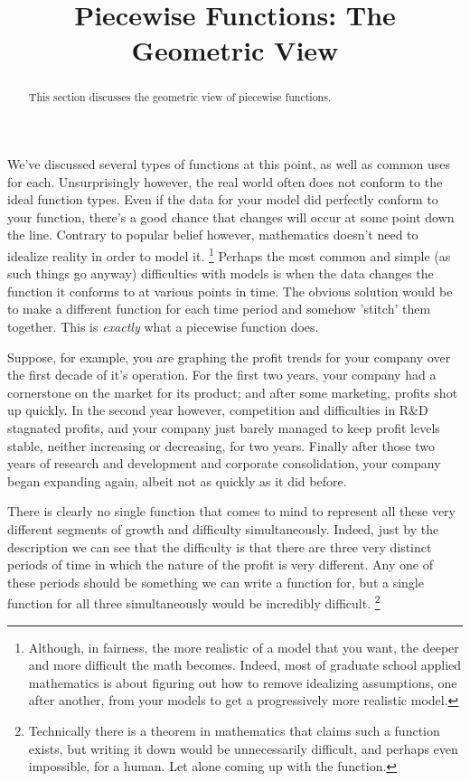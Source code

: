 \documentclass{ximeraXloud}
\title{Piecewise Functions: The Geometric View}
\begin{document}
\begin{abstract}
    This section discusses the geometric view of piecewise functions.
\end{abstract}
\maketitle

We've discussed several types of functions at this point, as well as common uses for each. Unsurprisingly however, the real world often does not conform to the ideal function types. Even if the data for your model did perfectly conform to your function, there's a good chance that changes will occur at some point down the line. Contrary to popular belief however, mathematics doesn't need to idealize reality in order to model it.%
\footnote{Although, in fairness, the more realistic of a model that you want, the deeper and more difficult the math becomes. Indeed, most of graduate school applied mathematics is about figuring out how to remove idealizing assumptions, one after another, from your models to get a progressively more realistic model.}
Perhaps the most common and simple (as such things go anyway) difficulties with models is when the data changes the function it conforms to at various points in time. The obvious solution would be to make a different function for each time period and somehow 'stitch' them together. This is \textit{exactly} what a piecewise function does.


Suppose, for example, you are graphing the profit trends for your company over the first decade of it's operation. For the first two years, your company had a cornerstone on the market for its product; and after some marketing, profits shot up quickly. In the second year however, competition and difficulties in R\&D stagnated profits, and your company just barely managed to keep profit levels stable, neither increasing or decreasing, for two years. Finally after those two years of research and development and corporate consolidation, your company began expanding again, albeit not as quickly as it did before.

There is clearly no single function that comes to mind to represent all these very different segments of growth and difficulty simultaneously. Indeed, just by the description we can see that the difficulty is that there are three very distinct periods of time in which the nature of the profit is very different. Any one of these periods should be something we can write a function for, but a single function for all three simultaneously would be incredibly difficult.%
\footnote{Technically there is a theorem in mathematics that claims such a function exists, but writing it down would be unnecessarily difficult, and perhaps even impossible, for a human. Let alone coming up with the function.}
\end{document}
